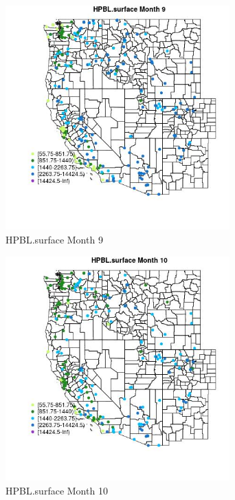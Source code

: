 \begin{figure} 
\centering  
\includegraphics[width=0.77\textwidth]{Code_Outputs/Report_ML_input_PM25_Step4_part_e_de_duplicated_aveswNAs_MapObsMo9HPBLsurface.jpg} 
\caption{\label{fig:Report_ML_input_PM25_Step4_part_e_de_duplicated_aveswNAsMapObsMo9HPBLsurface}HPBL.surface Month 9} 
\end{figure} 
 

\begin{figure} 
\centering  
\includegraphics[width=0.77\textwidth]{Code_Outputs/Report_ML_input_PM25_Step4_part_e_de_duplicated_aveswNAs_MapObsMo10HPBLsurface.jpg} 
\caption{\label{fig:Report_ML_input_PM25_Step4_part_e_de_duplicated_aveswNAsMapObsMo10HPBLsurface}HPBL.surface Month 10} 
\end{figure} 
 

